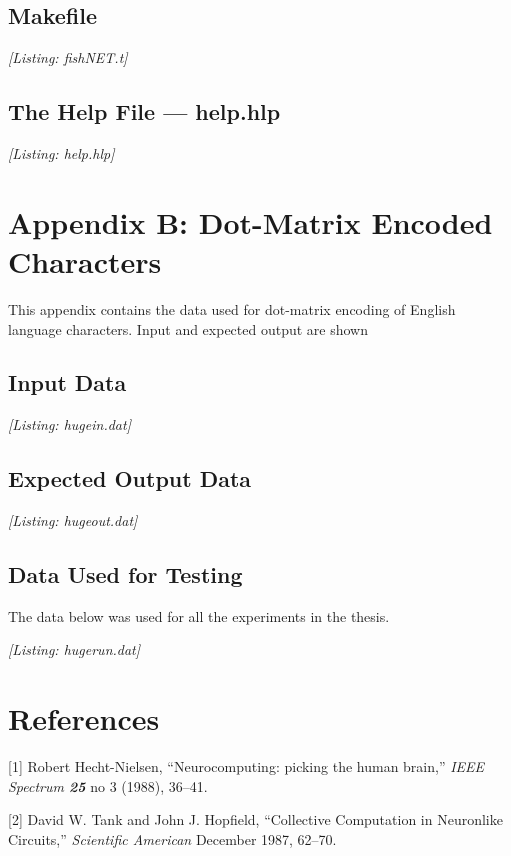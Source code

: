 \documentclass[12pt]{report}
\begin{document}
\section*{Makefile}


\textit{[Listing: fishNET.t]}

\section*{The Help File --- help.hlp}

\textit{[Listing: help.hlp]}


\chapter*{Appendix B: Dot-Matrix Encoded Characters}

This appendix contains the data used for dot-matrix encoding of
English language characters.
Input and expected output are shown

\section*{Input Data}

\textit{[Listing: hugein.dat]}

\section*{Expected Output Data}

\textit{[Listing: hugeout.dat]}

\section*{Data Used for Testing}

The data below was used for all the experiments in the thesis.

\textit{[Listing: hugerun.dat]}


\chapter*{References}

[1] Robert Hecht-Nielsen, ``Neurocomputing: picking the human brain,''
{\sl IEEE Spectrum \bf25} no 3 (1988), 36--41.

[2] David W. Tank and John J. Hopfield, ``Collective Computation in
Neuronlike Circuits,'' {\sl Scientific American} December 1987, 62--70.
\end{document}
